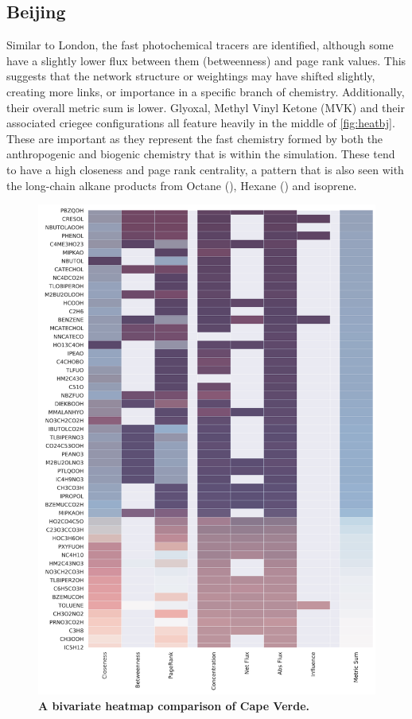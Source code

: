 \subsection*{Beijing}
Similar to London, the fast photochemical tracers are identified, although some have a slightly lower flux between them (betweenness) and page rank values. This suggests that the network structure or weightings may have shifted slightly, creating more links, or importance in a specific branch of chemistry. 
 Additionally, their overall metric sum is lower. Glyoxal, Methyl Vinyl Ketone (MVK) and their associated criegee configurations all feature heavily in the middle of \autoref{fig:heatbj}. These are important as they represent the fast chemistry formed by both the anthropogenic and biogenic chemistry that is within the simulation. These tend to have a high closeness and page rank centrality, a pattern that is also seen with the long-chain alkane products from Octane (), Hexane () and isoprene.



\begin{figure}[H]
     \centering
         \includegraphics[width=.95\textwidth]{figures_c3/mlpregressor/cape_CapeVerde.pdf}
        \caption{ \textbf{A bivariate heatmap comparison of Cape Verde.} }
        \label{fig:heatcv}
\end{figure}

